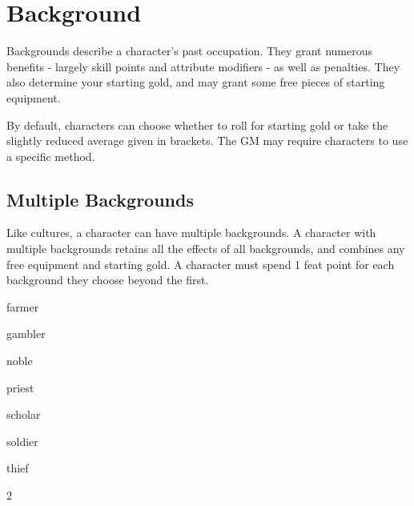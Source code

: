 \chapter{Background}\label{background}
\begin{multicols*}{2}
    Backgrounds describe a character's past occupation. They grant numerous
    benefits - largely skill points and attribute modifiers - as well as
    penalties. They also determine your starting gold, and may grant some
    free pieces of starting equipment.

    By default, characters can choose whether to roll for starting gold or take
    the slightly reduced average given in brackets. The GM may require
    characters to use a specific method.

    \section{Multiple Backgrounds}
    Like cultures, a character can have multiple backgrounds. A character with
    multiple backgrounds retains all the effects of all backgrounds, and
    combines any free equipment and starting gold. A character must spend 1
    feat point for each background they choose beyond the first.

    {farmer}

    {gambler}

    {noble}

    {priest}

    {scholar}

    {soldier}

    {thief}
\end{multicols*}{2}

